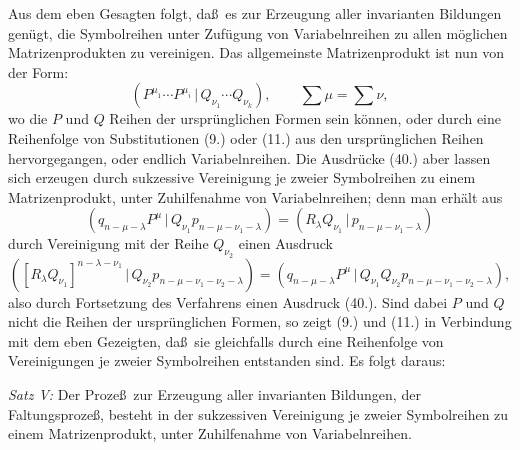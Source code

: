 \documentclass[11pt]{article}
\providecommand{\pair}[2]{(#1\,|\,#2)}
\begin{document}
Aus dem eben Gesagten folgt, da\ss\ es zur Erzeugung aller invarianten Bildungen gen\"ugt, die Symbolreihen unter Zuf\"ugung von Variabelnreihen zu allen m\"oglichen Matrizenprodukten zu vereinigen. Das allgemeinste Matrizenprodukt ist nun von der Form:
\begin{equation}
 \pair{P^{\mu_1}\cdots P^{\mu_i}}{Q_{\nu_1}\cdots Q_{\nu_k}},\qquad \sum\mu=\sum\nu,
\tag{40}
\end{equation}
wo die $P$ und $Q$ Reihen der urspr\"unglichen Formen sein k\"onnen, oder durch eine Reihenfolge von Substitutionen (9.) oder (11.) aus den urspr\"unglichen Reihen hervorgegangen, oder endlich Variabelnreihen. Die Ausdr\"ucke (40.) aber lassen sich erzeugen durch sukzessive Vereinigung je zweier Symbolreihen zu einem Matrizenprodukt, unter Zuhilfenahme von Variabelnreihen; denn man erh\"alt aus
\[
 \pair{q_{n-\mu-\lambda}P^\mu}{Q_{\nu_1}p_{n-\mu-\nu_1-\lambda}}=\pair{R_\lambda Q_{\nu_1}}{p_{n-\mu-\nu_1-\lambda}}
\]
durch Vereinigung mit der Reihe $Q_{\nu_2}$ einen Ausdruck
\[
 \pair{[R_\lambda Q_{\nu_1}]^{n-\lambda-\nu_1}}{Q_{\nu_2}p_{n-\mu-\nu_1-\nu_2-\lambda}}
 =\pair{q_{n-\mu-\lambda}P^\mu}{Q_{\nu_1}Q_{\nu_2}p_{n-\mu-\nu_1-\nu_2-\lambda}},
\]
also durch Fortsetzung des Verfahrens einen Ausdruck (40.). Sind dabei $P$ und $Q$ nicht die Reihen der urspr\"unglichen Formen, so zeigt (9.) und (11.) in Verbindung mit dem eben Gezeigten, da\ss\ sie gleichfalls durch eine Reihenfolge von Vereinigungen je zweier Symbolreihen entstanden sind. Es folgt daraus:

\emph{Satz V:} Der Proze\ss\ zur Erzeugung aller invarianten Bildungen, der Faltungsproze\ss, besteht in der sukzessiven Vereinigung je zweier Symbolreihen zu einem Matrizenprodukt, unter Zuhilfenahme von Variabelnreihen.
\end{document}
